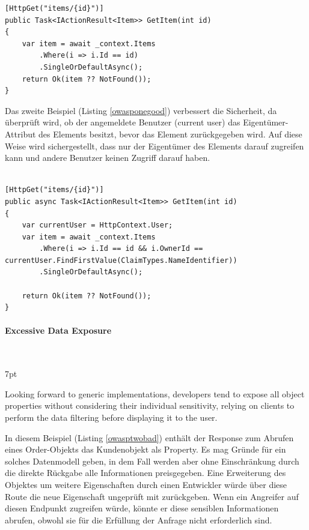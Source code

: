 \documentclass[notitlepage, hidelinks]{article}
\newenvironment{formal}{%
  \def\FrameCommand{%
    \hspace{1pt}%
    {\color{black}\vrule width 2pt}%
    {\color{formalshade}\vrule width 4pt}%
    \colorbox{formalshade}%
  }%
  \MakeFramed{\advance\hsize-\width\FrameRestore}%
  \noindent\hspace{-4.55pt}%
  \begin{adjustwidth}{}{7pt}%
  \vspace{2pt}\vspace{2pt}%
}
{%
  \vspace{2pt}\end{adjustwidth}\endMakeFramed%
}
\begin{document}
\begin{lstlisting}[language={[Sharp]C},frame=single,caption=Negativbeispiel Broken Object Level Authorization,label=owasponebad]
[HttpGet("items/{id}")] 
public Task<IActionResult<Item>> GetItem(int id) 
{ 
	var item = await _context.Items
        .Where(i => i.Id == id)
        .SingleOrDefaultAsync();
    return Ok(item ?? NotFound());
}
\end{lstlisting}

Das zweite Beispiel (Listing \ref{owasponegood}) verbessert die Sicherheit, da überprüft wird, ob der angemeldete Benutzer (current user) das Eigentümer-Attribut des Elements besitzt, bevor das Element zurückgegeben wird. Auf diese Weise wird sichergestellt, dass nur der Eigentümer des Elements darauf zugreifen kann und andere Benutzer keinen Zugriff darauf haben.

\begin{lstlisting}[language={[Sharp]C},frame=single,caption=Positivbeispiel Broken Object Level Authorization,label=owasponegood]

[HttpGet("items/{id}")]
public async Task<IActionResult<Item>> GetItem(int id)
{
    var currentUser = HttpContext.User;
    var item = await _context.Items
        .Where(i => i.Id == id && i.OwnerId == currentUser.FindFirstValue(ClaimTypes.NameIdentifier))
        .SingleOrDefaultAsync();

    return Ok(item ?? NotFound());
}
\end{lstlisting}


\paragraph{Excessive Data Exposure} \mbox{} \\
\begin{formal}
Looking forward to generic implementations, developers tend to expose all object properties without considering their individual sensitivity, relying on clients to perform the data filtering before displaying it to the user.
\end{formal}
In diesem Beispiel (Listing \ref{owasptwobad}) enthält der Response zum Abrufen eines Order-Objekts das Kundenobjekt als Property. Es mag Gründe für ein solches Datenmodell geben, in dem Fall werden aber ohne Einschränkung durch die direkte Rückgabe alle Informationen preisgegeben. Eine Erweiterung des Objektes  um weitere Eigenschaften durch einen Entwickler würde über diese Route die neue Eigenschaft ungeprüft mit zurückgeben. Wenn ein Angreifer auf diesen Endpunkt zugreifen würde, könnte er diese sensiblen Informationen abrufen, obwohl sie für die Erfüllung der Anfrage nicht erforderlich sind.
\end{document}
